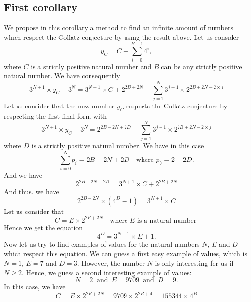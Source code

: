 \documentclass[11pt,a4paper]{article}
\theoremstyle{definition}
\begin{document}
\subsection*{First corollary}
We propose in this corollary a method to find an infinite amount of numbers which respect
the Collatz conjecture by using the result above. Let us consider
\[y_C=C+\sum_{i=0}^{B-1}4^{i},\]
where $C$ is a strictly positive natural number and $B$ can be any strictly positive
natural number. We have consequently
\begin{equation}
3^{N+1}\times y_C+3^{N}=3^{N+1}\times C+2^{2B+2N}-\sum_{j=1}^{N}3^{j-1}\times 2^{2B+2N-2\times j}
\end{equation}
Let us consider that the new number $y_C$ respects the Collatz conjecture by respecting the
first final form with
\begin{equation}
3^{N+1}\times y_C+3^{N}=2^{2B+2N+2D}-\sum_{j=1}^{N}3^{j-1}\times 2^{2B+2N-2\times j}
\end{equation}
where $D$ is a strictly positive natural number. We have in this case
\begin{equation}
\sum_{i=0}^{N}p_i=2B+2N+2D\quad\text{where }p_0=2+2D.
\end{equation}
And we have
\begin{equation}
2^{2B+2N+2D}=3^{N+1}\times C+2^{2B+2N}
\end{equation}
And thus, we have
\begin{equation}
2^{2B+2N}\times\left(4^{D}-1\right)=3^{N+1}\times C
\end{equation}
Let us consider that
\begin{equation}
C=E\times 2^{2B+2N}\quad\text{where }E\text{ is a natural number.}
\end{equation}
Hence we get the equation
\begin{equation}
4^{D}=3^{N+1}\times E+1.
\end{equation}
Now let us try to find examples of values for the natural numbers $N$, $E$ and $D$ which
respect this equation. We can guess a first easy example of values, which is $N=1$, $E=7$
and $D=3$. However, the number $N$ is only interesting for us if $N\ge 2$. Hence, we guess
a second interesting example of values:
\begin{equation}
N=2\ \text{ and }\ E=9709\ \text{ and }\ D=9.
\end{equation}
In this case, we have
\begin{equation}
C=E\times 2^{2B+2N}=9709\times 2^{2B+4}=155344\times 4^{B}
\end{equation}
\end{document}
